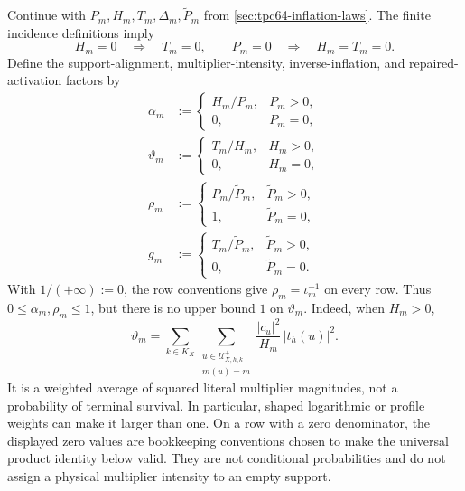 Continue with \(P_m,H_m,T_m,\Delta_m,\widetilde P_m\) from
\cref{sec:tpc64-inflation-laws}.  The finite incidence definitions imply
\begin{equation}
 H_m=0\quad\Longrightarrow\quad T_m=0,
 \qquad
 P_m=0\quad\Longrightarrow\quad H_m=T_m=0.
 \label{eq:tpc64-zero-propagation}
\end{equation}
Define the support-alignment, multiplier-intensity, inverse-inflation, and
repaired-activation factors by
\begin{align}
 \alpha_m
 &:=
 \begin{cases}
  H_m/P_m,&P_m>0,\\
  0,&P_m=0,
 \end{cases}
 \label{eq:tpc64-support-alignment-factor}\\
 \vartheta_m
 &:=
 \begin{cases}
  T_m/H_m,&H_m>0,\\
  0,&H_m=0,
 \end{cases}
 \label{eq:tpc64-multiplier-intensity-factor}\\
 \rho_m
 &:=
 \begin{cases}
  P_m/\widetilde P_m,&\widetilde P_m>0,\\
  1,&\widetilde P_m=0,
 \end{cases}
 \label{eq:tpc64-inverse-inflation-factor}\\
 g_m
 &:=
 \begin{cases}
  T_m/\widetilde P_m,&\widetilde P_m>0,\\
  0,&\widetilde P_m=0.
 \end{cases}
 \label{eq:tpc64-repaired-row-activation}
\end{align}
With \(1/(+\infty):=0\), the row conventions give
\(\rho_m=\iota_m^{-1}\) on every row.  Thus
\(0\le\alpha_m,\rho_m\le1\), but there is no upper bound \(1\) on
\(\vartheta_m\).  Indeed, when \(H_m>0\),
\begin{equation}
 \vartheta_m
 =
 \sum_{k\in K_X}
 \sum_{\substack{u\in\mathcal U_{X,h,k}^{+}\\m(u)=m}}
 \frac{|c_u|^2}{H_m}\,|t_h(u)|^2.
 \label{eq:tpc64-intensity-weighted-average}
\end{equation}
It is a weighted average of squared literal multiplier magnitudes, not a
probability of terminal survival.  In particular, shaped logarithmic or
profile weights can make it larger than one.
On a row with a zero denominator, the displayed zero values are
bookkeeping conventions chosen to make the universal product identity
below valid.  They are not conditional probabilities and do not assign a
physical multiplier intensity to an empty support.

